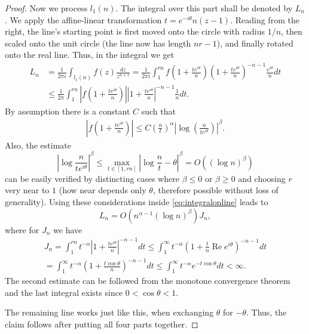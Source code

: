 \begin{proof}
Now we process $l_1(n)$. The integral over this part shall be denoted by $L_n$.
We apply the affine-linear transformation $t = e^{-i \theta} n (z - 1)$. 
Reading from the right, the line's starting point is first moved onto the circle with radius $1/n$, then scaled onto the unit circle (the line now has length $nr - 1$), and finally rotated onto the real line.
Thus, in the integral we get
\begin{align}
    L_n &= \frac{1}{2 \pi i} \int_{l_1(n)} f(z) \frac{dz}{z^{n+1}}
    = \frac{1}{2 \pi i} \int_1^{r n} f \left( 1 + \frac{t e^{i \theta} }{n} \right) \left( 1 + \frac{t e^{i \theta}}{n} \right)^{-n-1} \frac{e^{i \theta}}{n} dt \nonumber \\
    &\leq \frac{1}{2 \pi} \int_1^{r n} \left|  f \left( 1 + \frac{t e^{i \theta} }{n} \right)  \right| \left| 1 + \frac{t e^{i \theta}}{n} \right|^{-n-1} \frac{1}{n} dt \label{eq:integralonline}.
\end{align}
By assumption there is a constant $C$ such that 
\begin{align*}
    \left|  f \left( 1 + \frac{t e^{i \theta} }{n} \right)  \right|
    \leq C \left( \frac{n}{t} \right)^\alpha \left| \log \left( \frac{n}{t e^{i \theta}} \right ) \right|^{\beta}.
\end{align*}
Also, the estimate
\begin{equation*}
    \left| \log \frac{n}{t e^{i \theta}} \right|^\beta 
    \leq \max_{t \in [1, r n]} \left| \log \frac{n}{t} - \theta \right|^\beta 
    = O((\log n)^\beta)
\end{equation*}
can be easily verified by distincting cases where $\beta \leq 0$ or $\beta \geq 0$ and choosing $r$ very near to $1$ (how near depends only $\theta$, therefore possible without loss of generality).
Using these considerations inside \eqref{eq:integralonline} leads to
\begin{equation*}
    L_n = O(n^{\alpha - 1} (\log n)^\beta) J_n,
\end{equation*}
where for $J_n$ we have
\begin{align*}
    J_n = \int_1^{r n} t^{-\alpha} \left| 1 + \frac{t e^{i \theta}}{n} \right|^{-n-1} dt 
    \leq \int_1^\infty t^{-\alpha} \left( 1 + \frac{t}{n} \operatorname{Re} e^{i \theta} \right)^{-n-1} dt \\
    = \int_1^\infty t^{-\alpha} \left( 1 + \frac{t \cos \theta}{n} \right)^{-n-1} dt
    \leq \int_1^\infty t^{-\alpha} e^{-t \cos \theta} dt < \infty.
\end{align*}
The second estimate can be followed from the monotone convergence theorem and the last integral exists since $0 < \cos \theta < 1$.

The remaining line works just like this, when exchanging $\theta$ for $-\theta$. Thus, the claim follows after putting all four parts together.
\end{proof}


